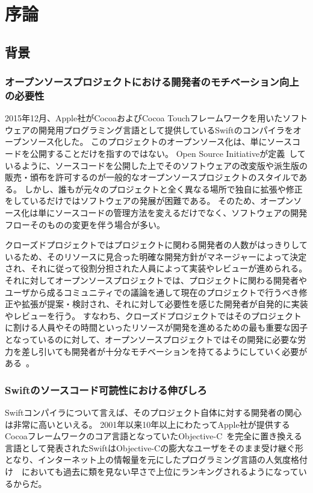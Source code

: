 \chapter{序論}
\label{introduction}

\section{背景}
\label{introduction:background}

\subsection{オープンソースプロジェクトにおける開発者のモチベーション向上の必要性}

2015年12月、Apple社がCocoaおよびCocoa Touchフレームワークを用いたソフトウェアの開発用プログラミング言語として提供しているSwiftのコンパイラをオープンソース化した。
このプロジェクトのオープンソース化は、単にソースコードを公開することだけを指すのではない。
Open Source Initiativeが定義~\cite{opensource}しているように、ソースコードを公開した上でそのソフトウェアの改変版や派生版の販売・頒布を許可するのが一般的なオープンソースプロジェクトのスタイルである。
しかし、誰もが元々のプロジェクトと全く異なる場所で独自に拡張や修正をしているだけではソフトウェアの発展が困難である。
そのため、オープンソース化は単にソースコードの管理方法を変えるだけでなく、ソフトウェアの開発フローそのものの変更を伴う場合が多い。

クローズドプロジェクトではプロジェクトに関わる開発者の人数がはっきりしているため、そのリソースに見合った明確な開発方針がマネージャーによって決定され、それに従って役割分担された人員によって実装やレビューが進められる。
それに対してオープンソースプロジェクトでは、プロジェクトに関わる開発者やユーザから成るコミュニティでの議論を通して現在のプロジェクトで行うべき修正や拡張が提案・検討され、それに対して必要性を感じた開発者が自発的に実装やレビューを行う。
すなわち、クローズドプロジェクトではそのプロジェクトに割ける人員やその時間といったリソースが開発を進めるための最も重要な因子となっているのに対して、オープンソースプロジェクトではその開発に必要な労力を差し引いても開発者が十分なモチベーションを持てるようにしていく必要がある~\cite{raymond}。

\subsection{Swiftのソースコード可読性における伸びしろ}

Swiftコンパイラについて言えば、そのプロジェクト自体に対する開発者の関心は非常に高いといえる。
2001年以来10年以上にわたってApple社が提供するCocoaフレームワークのコア言語となっていたObjective-C~\cite{objective-c}を完全に置き換える言語として発表されたSwiftはObjective-Cの膨大なユーザをそのまま受け継ぐ形となり、インターネット上の情報量を元にしたプログラミング言語の人気度格付け~\cite{tiobe}~\cite{redmonk}においても過去に類を見ない早さで上位にランキングされるようになっているからだ。

